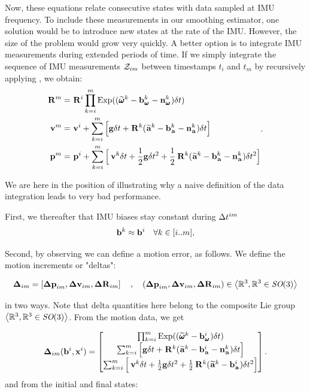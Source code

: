 Now, these equations relate consecutive states with data sampled at IMU frequency. To include these measurements in our smoothing estimator,
one solution would be to introduce new states at the rate of the IMU. However, the size of the problem would grow very quickly. A better option
is to integrate IMU measurements during extended periods of time. If we simply integrate the sequence of IMU measurements $\mathcal{Z}_{im}$ between timestamps 
$t_i$ and $t_m$ by recursively applying , we obtain:
%
\begin{equation}
    \begin{split}
    \prescript{}{}{{\bf R}}_{}^{m}  &= \prescript{}{}{{\bf R}}_{}^{i} \prod_{k=i}^{m} \operatorname*{Exp}((\prescript{}{}{\widetilde{\pmb{\omega}}}_{}^k - {\bf b}_{\prescript{}{}{\pmb{\omega}}_{}}^k - {\bf n}_{\prescript{}{}{\pmb{\omega}}_{}}^k)\delta t) \\
    \prescript{}{}{{\bf v}}_{}^{m}  &= \prescript{}{}{{\bf v}}_{}^{i} + \sum_{k=i}^{m} \Big[{\bf g} \delta t + \prescript{}{}{{\bf R}}_{}^{k}(\prescript{}{}{\widetilde{{\bf a}}}_{}^k - {\bf b}_{\prescript{}{}{{\bf a}}_{}}^k - {\bf n}_{\prescript{}{}{{\bf a}}_{}}^k)\delta t \Big]  \\
    \prescript{}{}{{\bf p}}_{}^{m} &= \prescript{}{}{{\bf p}}_{}^{i} + \sum_{k=i}^{m} \Big[\prescript{}{}{{\bf v}}_{}^{k}\delta t + \frac{1}{2}{\bf g} \delta t^2 
    + \frac{1}{2}\prescript{}{}{{\bf R}}_{}^{k}(\prescript{}{}{\widetilde{{\bf a}}}_{}^k - {\bf b}_{\prescript{}{}{{\bf a}}_{}}^k - {\bf n}_{\prescript{}{}{{\bf a}}_{}}^k)\delta t^2 \Big]
    \end{split}.
    \label{eq:IMUIntij}
\end{equation}

We are here in the position of illustrating why a naive definition of the data integration leads to very bad performance. 

First, we thereafter that IMU biases stay constant during $\Delta t^{im}$
\begin{equation*}
    {\bf b}^k \approx {\bf b}^i  ~~~ \forall k \in [i..m],
\end{equation*}


Second, by observing  we can define a motion error, as follows. We define the motion increments or "deltas":

\begin{equation}
    {\bm \Delta}_{im} = \left[{\bm \Delta {\bf p}}_{im}, {\bm \Delta {\bf v}}_{im}, {\bm \Delta {\bf R}}_{im} \right] \quad , \quad ({\bm \Delta {\bf p}}_{im},{\bm \Delta {\bf v}}_{im},{\bm \Delta {\bf R}}_{im}) \in \left< \mathbb{R}^3,\mathbb{R}^3\in \textit{SO}(3) \right>
    \label{eq:delta_imu_def}
\end{equation}

in two ways. Note that delta quantities here belong to the composite Lie group $\left< \mathbb{R}^3,\mathbb{R}^3\in \textit{SO}(3) \right>$. From the motion data, we get

\begin{align}
    {\bm \Delta}_{im}({\bf b}^i, {\bf x}^i) = 
    \begin{bmatrix}
    \prod_{k=i}^{m} \operatorname*{Exp}((\prescript{}{}{\widetilde{\pmb{\omega}}}_{}^k - {\bf b}_{\prescript{}{}{\pmb{\omega}}_{}}^i)\delta t)  \\
    \sum_{k=i}^{m} \Big[{\bf g} \delta t + \prescript{}{}{{\bf R}}_{}^{k}(\prescript{}{}{\widetilde{{\bf a}}}_{}^k - {\bf b}_{\prescript{}{}{{\bf a}}_{}}^i - {\bf n}_{\prescript{}{}{{\bf a}}_{}}^k)\delta t \Big]  \\
    \sum_{k=i}^{m} \Big[\prescript{}{}{{\bf v}}_{}^{k}\delta t + \frac{1}{2}{\bf g} \delta t^2 
    + \frac{1}{2}\prescript{}{}{{\bf R}}_{}^{k}(\prescript{}{}{\widetilde{{\bf a}}}_{}^k - {\bf b}_{\prescript{}{}{{\bf a}}_{}}^i)\delta t^2 \Big]
    \end{bmatrix}.
    \label{eq:imu_delta_naive}
\end{align}
%
and from the initial and final states:

